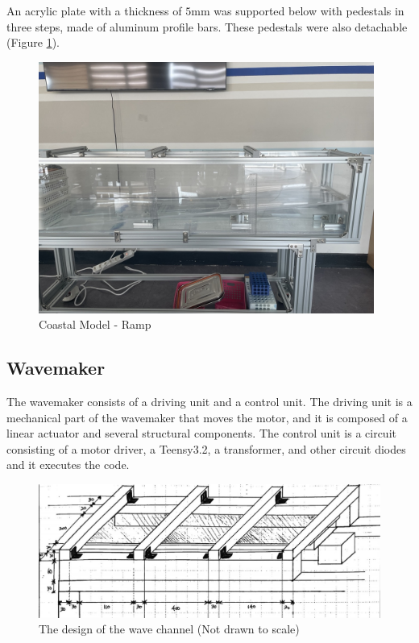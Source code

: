 An acrylic plate with a thickness of $5\mathrm{mm}$ was supported below with pedestals in three steps, made of aluminum profile bars. These pedestals were also detachable (Figure \ref{Coastal_Model(Ramp)}).

\begin{figure}[H]
    \centering
    \includegraphics[width=11cm]{images/Coastal_Model(Ramp).jpg}
    \caption{Coastal Model - Ramp}
    \label{Coastal_Model(Ramp)}
\end{figure}

\subsection{Wavemaker}%

The wavemaker consists of a driving unit and a control unit. The driving unit is a mechanical part of the wavemaker that moves the motor, and it is composed of a linear actuator and several structural components. The control unit is a circuit consisting of a motor driver, a Teensy3.2, a transformer, and other circuit diodes and it executes the code.

\begin{figure}[H]
    \centering
    \includegraphics[width=12cm]{images/Wave_Maker(Design_not_drawn_to_scale).jpg}
    
    \caption{The design of the wave channel (Not drawn to scale)}
    \label{Wave_Tank(Design)}
\end{figure}

